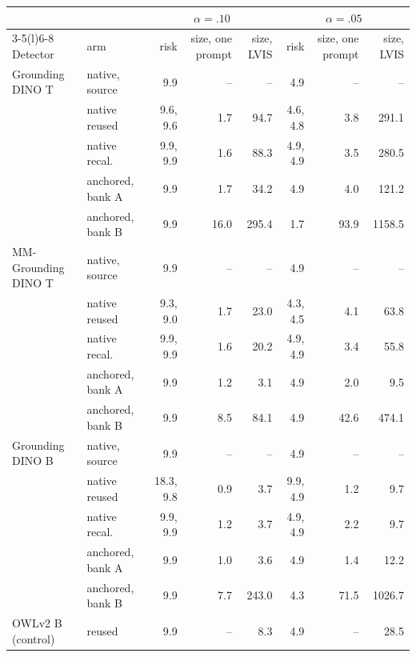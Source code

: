 \setlength{\tabcolsep}{3pt}\begin{tabular}{@{}llrrrrrr@{}}
\toprule
& & \multicolumn{3}{c}{$\alpha=.10$} & \multicolumn{3}{c}{$\alpha=.05$} \\ \cmidrule(lr){3-5}\cmidrule(l){6-8}
Detector & arm & risk & size, one prompt & size, LVIS & risk & size, one prompt & size, LVIS \\
\midrule
Grounding DINO T & native, source & 9.9 & -- & -- & 4.9 & -- & -- \\
 & native reused & 9.6, 9.6 & 1.7 & 94.7 & 4.6, 4.8 & 3.8 & 291.1 \\
 & native recal. & 9.9, 9.9 & 1.6 & 88.3 & 4.9, 4.9 & 3.5 & 280.5 \\
 & anchored, bank A & 9.9 & 1.7 & 34.2 & 4.9 & 4.0 & 121.2 \\
 & anchored, bank B & 9.9 & 16.0 & 295.4 & 1.7 & 93.9 & 1158.5 \\
\midrule
MM-Grounding DINO T & native, source & 9.9 & -- & -- & 4.9 & -- & -- \\
 & native reused & 9.3, 9.0 & 1.7 & 23.0 & 4.3, 4.5 & 4.1 & 63.8 \\
 & native recal. & 9.9, 9.9 & 1.6 & 20.2 & 4.9, 4.9 & 3.4 & 55.8 \\
 & anchored, bank A & 9.9 & 1.2 & 3.1 & 4.9 & 2.0 & 9.5 \\
 & anchored, bank B & 9.9 & 8.5 & 84.1 & 4.9 & 42.6 & 474.1 \\
\midrule
Grounding DINO B & native, source & 9.9 & -- & -- & 4.9 & -- & -- \\
 & native reused & 18.3, 9.8 & 0.9 & 3.7 & 9.9, 4.9 & 1.2 & 9.7 \\
 & native recal. & 9.9, 9.9 & 1.2 & 3.7 & 4.9, 4.9 & 2.2 & 9.7 \\
 & anchored, bank A & 9.9 & 1.0 & 3.6 & 4.9 & 1.4 & 12.2 \\
 & anchored, bank B & 9.9 & 7.7 & 243.0 & 4.3 & 71.5 & 1026.7 \\
\midrule
OWLv2 B (control) & reused & 9.9 & -- & 8.3 & 4.9 & -- & 28.5 \\
\bottomrule
\end{tabular}
